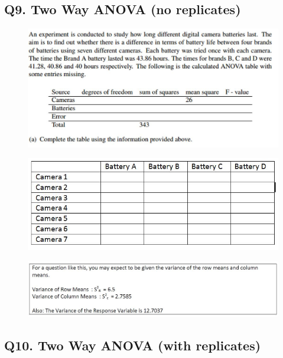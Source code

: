\documentclass[a4paper,12pt]{article}
\begin{document}
\subsection*{Q9. Two Way ANOVA (no replicates)}
\begin{figure}[h!]
	\centering
	\includegraphics[width=0.9\linewidth]{image/Q28Review1}
	
\end{figure}
\begin{figure}[h!]
	\centering
	\includegraphics[width=0.9\linewidth]{image/Q28Review3}
	
\end{figure}
\begin{figure}[h!]
	\centering
	\includegraphics[width=0.9\linewidth]{image/Q28Review2}
	
\end{figure}
\newpage
\subsection*{Q10. Two Way ANOVA (with replicates)}
\end{document}
